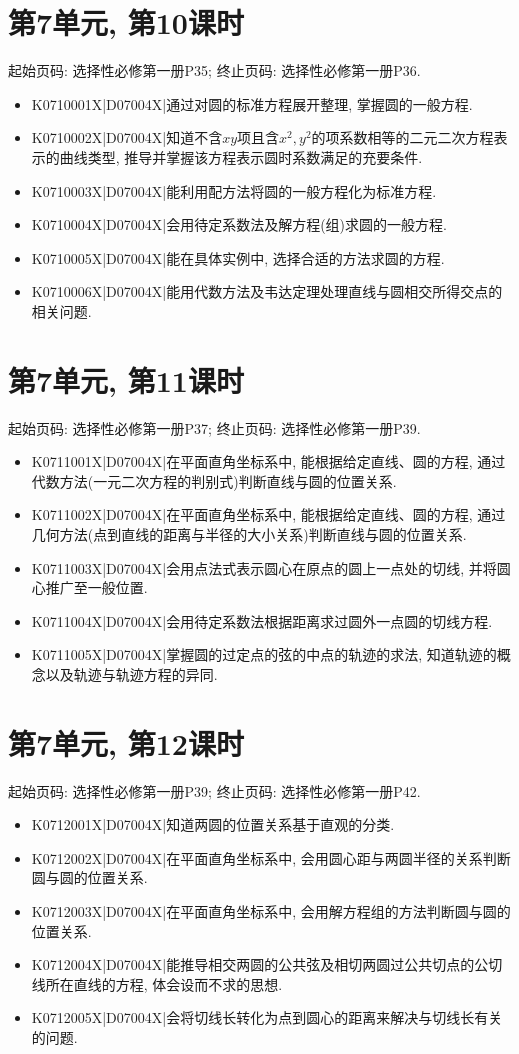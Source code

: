 \section*{第7单元, 第10课时}
起始页码: 选择性必修第一册P35; 终止页码: 选择性必修第一册P36.
\begin{itemize}
\item K0710001X|D07004X|通过对圆的标准方程展开整理, 掌握圆的一般方程.
\item K0710002X|D07004X|知道不含$xy$项且含$x^2, y^2$的项系数相等的二元二次方程表示的曲线类型, 推导并掌握该方程表示圆时系数满足的充要条件.
\item K0710003X|D07004X|能利用配方法将圆的一般方程化为标准方程.
\item K0710004X|D07004X|会用待定系数法及解方程(组)求圆的一般方程.
\item K0710005X|D07004X|能在具体实例中, 选择合适的方法求圆的方程.
\item K0710006X|D07004X|能用代数方法及韦达定理处理直线与圆相交所得交点的相关问题.
\end{itemize}

\section*{第7单元, 第11课时}
起始页码: 选择性必修第一册P37; 终止页码: 选择性必修第一册P39.
\begin{itemize}
\item K0711001X|D07004X|在平面直角坐标系中, 能根据给定直线、圆的方程, 通过代数方法(一元二次方程的判别式)判断直线与圆的位置关系.
\item K0711002X|D07004X|在平面直角坐标系中, 能根据给定直线、圆的方程, 通过几何方法(点到直线的距离与半径的大小关系)判断直线与圆的位置关系.
\item K0711003X|D07004X|会用点法式表示圆心在原点的圆上一点处的切线, 并将圆心推广至一般位置.
\item K0711004X|D07004X|会用待定系数法根据距离求过圆外一点圆的切线方程.
\item K0711005X|D07004X|掌握圆的过定点的弦的中点的轨迹的求法, 知道轨迹的概念以及轨迹与轨迹方程的异同.
\end{itemize}

\section*{第7单元, 第12课时}
起始页码: 选择性必修第一册P39; 终止页码: 选择性必修第一册P42.
\begin{itemize}
\item K0712001X|D07004X|知道两圆的位置关系基于直观的分类.
\item K0712002X|D07004X|在平面直角坐标系中, 会用圆心距与两圆半径的关系判断圆与圆的位置关系.
\item K0712003X|D07004X|在平面直角坐标系中, 会用解方程组的方法判断圆与圆的位置关系.
\item K0712004X|D07004X|能推导相交两圆的公共弦及相切两圆过公共切点的公切线所在直线的方程, 体会设而不求的思想.
\item K0712005X|D07004X|会将切线长转化为点到圆心的距离来解决与切线长有关的问题.
\end{itemize}

